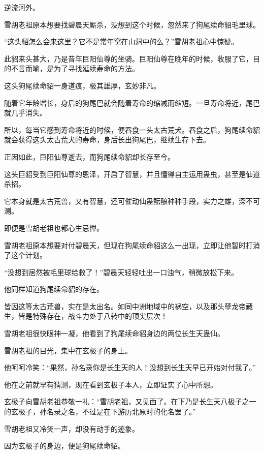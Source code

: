 
\begin{this_body}

逆流河外。

雪胡老祖原本想要找碧晨天厮杀，没想到这个时候，忽然来了狗尾续命貂毛里球。

“这头貂怎么会来这里？它不是常年窝在山洞中的么？”雪胡老祖心中惊疑。

此貂来头甚大，乃是昔年巨阳仙尊的坐骑。巨阳仙尊在晚年的时候，收服了它，目的不言而喻，是为了寻找延续寿命的方法。

这头狗尾续命貂一身道痕，极其雄厚，玄妙非凡。

随着它年龄增长，身后的狗尾巴就会随着寿命的缩减而缩短。一旦寿命将近，尾巴就几乎消失。

所以，每当它感到寿命将近的时候，便吞食一头太古荒犬。吞食之后，狗尾续命貂就会获得这头太古荒犬的寿命，身后长出狗尾巴，继续生存下去。

正因如此，巨阳仙尊逝去，而狗尾续命貂却长存至今。

这头巨貂受到巨阳仙尊的恩泽，开启了智慧，并且懂得自主运用蛊虫，甚至是仙道杀招。

它本身就是太古荒兽，又有智慧，还可催动仙蛊酝酿种种手段，实力之雄，深不可测。

即便是雪胡老祖也都心生忌惮。

雪胡老祖原本想要对付碧晨天，但现在狗尾续命貂这么一出现，立即让他暂时打消了这个计划。

“没想到居然被毛里球给救了！”碧晨天轻轻吐出一口浊气，稍微放松下来。

他同样知道狗尾续命貂的存在。

皆因这等太古荒兽，实在是太出名。如同中洲地域中的祸空，以及那头孽龙帝藏生，皆是特殊存在，战斗力处于八转中的顶尖层次！

雪胡老祖很快眼神一凝，他看到了狗尾续命貂身边的两位长生天蛊仙。

雪胡老祖的目光，集中在玄极子的身上。

他呵呵冷笑：“果然，孙名录你是长生天的人！没想到长生天早已开始对付我了。”

他在之前就早有猜测，现在看到玄极子本人，立即证实了心中所想。

玄极子向雪胡老祖恭敬一礼：“雪胡老祖，又见面了。在下乃是长生天八极子之一的玄极子，孙名录之名，不过是在下游历北原时的化名罢了。”

雪胡老祖又冷笑一声，却没有动手的迹象。

因为玄极子的身边，便是狗尾续命貂。


\end{this_body}
